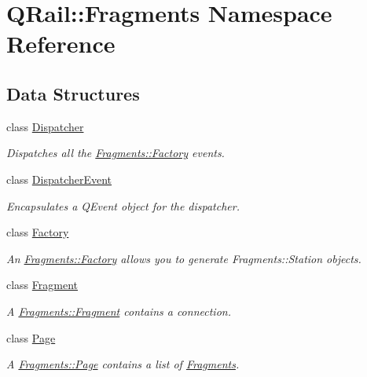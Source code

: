 \hypertarget{namespaceQRail_1_1Fragments}{}\section{Q\+Rail\+::Fragments Namespace Reference}
\label{namespaceQRail_1_1Fragments}
\subsection*{Data Structures}
\begin{DoxyCompactItemize}
\item 
class \mbox{\hyperlink{classQRail_1_1Fragments_1_1Dispatcher}{Dispatcher}}
\begin{DoxyCompactList}\small\item\em Dispatches all the \mbox{\hyperlink{classQRail_1_1Fragments_1_1Factory}{Fragments\+::\+Factory}} events. \end{DoxyCompactList}\item 
class \mbox{\hyperlink{classQRail_1_1Fragments_1_1DispatcherEvent}{Dispatcher\+Event}}
\begin{DoxyCompactList}\small\item\em Encapsulates a Q\+Event object for the dispatcher. \end{DoxyCompactList}\item 
class \mbox{\hyperlink{classQRail_1_1Fragments_1_1Factory}{Factory}}
\begin{DoxyCompactList}\small\item\em An \mbox{\hyperlink{classQRail_1_1Fragments_1_1Factory}{Fragments\+::\+Factory}} allows you to generate Fragments\+::\+Station objects. \end{DoxyCompactList}\item 
class \mbox{\hyperlink{classQRail_1_1Fragments_1_1Fragment}{Fragment}}
\begin{DoxyCompactList}\small\item\em A \mbox{\hyperlink{classQRail_1_1Fragments_1_1Fragment}{Fragments\+::\+Fragment}} contains a connection. \end{DoxyCompactList}\item 
class \mbox{\hyperlink{classQRail_1_1Fragments_1_1Page}{Page}}
\begin{DoxyCompactList}\small\item\em A \mbox{\hyperlink{classQRail_1_1Fragments_1_1Page}{Fragments\+::\+Page}} contains a list of \mbox{\hyperlink{namespaceQRail_1_1Fragments}{Fragments}}. \end{DoxyCompactList}\end{DoxyCompactItemize}
